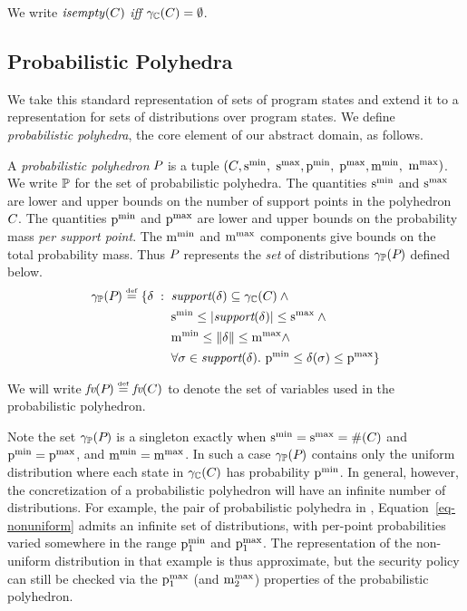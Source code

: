 We write $\mathit{isempty}(C)$ \emph{iff} $\gamma_{\mathbb{C}}(C) = \emptyset$.

\subsection{Probabilistic Polyhedra}

We take this standard representation of sets of program states and
extend it to a representation for sets of distributions over program
states.  We define \emph{probabilistic polyhedra}, the core element of
our abstract domain, as follows.

\begin{definition} \label{def:ppoly}
A \emph{probabilistic polyhedron} $P_{}$ is a tuple
$(C_{},\mathrm{s}^\mathrm{min}_{},$ $\mathrm{s}^\mathrm{max}_{}, \mathrm{p}^\mathrm{min}_{},$ $\mathrm{p}^\mathrm{max}_{}, \mathrm{m}^\mathrm{min}_{},$ $\mathrm{m}^\mathrm{max}_{})$.  
We write $\mathbb{P}$ for the set of probabilistic polyhedra.  The
quantities $\mathrm{s}^\mathrm{min}_{}$ and $ \mathrm{s}^\mathrm{max}_{}$ are lower and upper bounds on 
the number of support points in the polyhedron $C_{}$.  The quantities
$\mathrm{p}^\mathrm{min}_{} $ and $ \mathrm{p}^\mathrm{max}_{} $ are lower and upper bounds on the
probability mass \emph{per support point}.  The $ \mathrm{m}^\mathrm{min}_{} $ and $
\mathrm{m}^\mathrm{max}_{} $ components give bounds on the total probability mass.  
Thus $P_{}$ represents the \emph{set} of distributions
$\gamma_{\mathbb{P}}(P_{})$ defined below. 
\[
\gamma_{\mathbb{P}}(P_{}) \stackrel{\smash{\scriptscriptstyle \mathrm{def}}}=
\begin{aligned}[t]
\{\delta \;:\; {} & \textit{support}(\delta) \subseteq \gamma_{\mathbb{C}}(C_{}) \wedge {} \\
  & \mathrm{s}^\mathrm{min}_{} \leq \left| \textit{support}(\delta) \right| \leq \mathrm{s}^\mathrm{max}_{} \wedge {} \\
  & \mathrm{m}^\mathrm{min}_{} \leq \mathord{\parallel}\delta\mathord{\parallel} \leq \mathrm{m}^\mathrm{max}_{} \wedge \\
  & \forall \sigma \in \textit{support}(\delta).\ \mathrm{p}^\mathrm{min}_{} \leq \delta(\sigma) \leq \mathrm{p}^\mathrm{max}_{}\}
\end{aligned}
\]

We will write $ \textit{fv}(P_{}) \stackrel{\smash{\scriptscriptstyle \mathrm{def}}}= \textit{fv}(C) $ to denote the set of variables
used in the probabilistic polyhedron. 

\end{definition}
Note the set $\gamma_{\mathbb{P}}(P_{})$ is a singleton exactly when $\mathrm{s}^\mathrm{min}_{} =
\mathrm{s}^\mathrm{max}_{} = \#(C_{})$ and $\mathrm{p}^\mathrm{min}_{} = \mathrm{p}^\mathrm{max}_{}$, and $\mathrm{m}^\mathrm{min}_{} =
\mathrm{m}^\mathrm{max}_{}$.  In such a case $\gamma_{\mathbb{P}}(P_{})$ contains only the uniform
distribution where each state in $\gamma_{\mathbb{C}}(C_{})$ has probability
$\mathrm{p}^\mathrm{min}_{}$. In general, however, the concretization of a probabilistic
polyhedron will have an infinite number of distributions. For example,
the pair of probabilistic polyhedra in ,
Equation~\ref{eq-nonuniform} admits an infinite set of distributions,
with per-point probabilities varied somewhere in the range $ \mathrm{p}^\mathrm{min}_{1}
$ and $ \mathrm{p}^\mathrm{max}_{1} $. The representation of the non-uniform distribution
in that example is thus approximate, but the security policy can still
be checked via the $ \mathrm{p}^\mathrm{max}_{1} $ (and $ \mathrm{m}^\mathrm{max}_{2} $) properties of the
probabilistic polyhedron.

